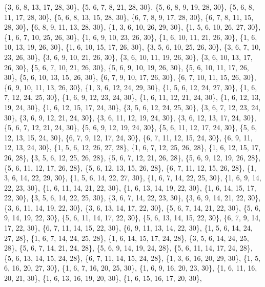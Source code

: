 \documentclass[11pt,a4paper]{article}
\begin{document}
{\{3, 6, 8, 13, 17, 28, 30\}, \{5, 6, 7, 8, 21, 28, 30\}, \{5, 6, 8, 9, 19, 28, 30\}, \{5, 6, 8, 11, 17, 28, 30\}, \{5, 6, 8, 13, 15, 28, 30\},
\{6, 7, 8, 9, 17, 28, 30\}, \{6, 7, 8, 11, 15, 28, 30\}, \{6, 8, 9, 11, 13, 28, 30\}, \{1, 3, 6, 10, 26, 29, 30\}, \{1, 5, 6, 10, 26, 27, 30\},
\{1, 6, 7, 10, 25, 26, 30\}, \{1, 6, 9, 10, 23, 26, 30\}, \{1, 6, 10, 11, 21, 26, 30\}, \{1, 6, 10, 13, 19, 26, 30\}, \{1, 6, 10, 15, 17, 26, 30\},
\{3, 5, 6, 10, 25, 26, 30\}, \{3, 6, 7, 10, 23, 26, 30\}, \{3, 6, 9, 10, 21, 26, 30\}, \{3, 6, 10, 11, 19, 26, 30\}, \{3, 6, 10, 13, 17, 26, 30\},
\{5, 6, 7, 10, 21, 26, 30\}, \{5, 6, 9, 10, 19, 26, 30\}, \{5, 6, 10, 11, 17, 26, 30\}, \{5, 6, 10, 13, 15, 26, 30\}, \{6, 7, 9, 10, 17, 26, 30\},
\{6, 7, 10, 11, 15, 26, 30\}, \{6, 9, 10, 11, 13, 26, 30\}, \{1, 3, 6, 12, 24, 29, 30\}, \{1, 5, 6, 12, 24, 27, 30\}, \{1, 6, 7, 12, 24, 25, 30\},
\{1, 6, 9, 12, 23, 24, 30\}, \{1, 6, 11, 12, 21, 24, 30\}, \{1, 6, 12, 13, 19, 24, 30\}, \{1, 6, 12, 15, 17, 24, 30\}, \{3, 5, 6, 12, 24, 25, 30\},
\{3, 6, 7, 12, 23, 24, 30\}, \{3, 6, 9, 12, 21, 24, 30\}, \{3, 6, 11, 12, 19, 24, 30\}, \{3, 6, 12, 13, 17, 24, 30\}, \{5, 6, 7, 12, 21, 24, 30\},
\{5, 6, 9, 12, 19, 24, 30\}, \{5, 6, 11, 12, 17, 24, 30\}, \{5, 6, 12, 13, 15, 24, 30\}, \{6, 7, 9, 12, 17, 24, 30\}, \{6, 7, 11, 12, 15, 24, 30\},
\{6, 9, 11, 12, 13, 24, 30\}, \{1, 5, 6, 12, 26, 27, 28\}, \{1, 6, 7, 12, 25, 26, 28\}, \{1, 6, 12, 15, 17, 26, 28\}, \{3, 5, 6, 12, 25, 26, 28\},
\{5, 6, 7, 12, 21, 26, 28\}, \{5, 6, 9, 12, 19, 26, 28\}, \{5, 6, 11, 12, 17, 26, 28\}, \{5, 6, 12, 13, 15, 26, 28\}, \{6, 7, 11, 12, 15, 26, 28\},
\{1, 3, 6, 14, 22, 29, 30\}, \{1, 5, 6, 14, 22, 27, 30\}, \{1, 6, 7, 14, 22, 25, 30\}, \{1, 6, 9, 14, 22, 23, 30\}, \{1, 6, 11, 14, 21, 22, 30\},
\{1, 6, 13, 14, 19, 22, 30\}, \{1, 6, 14, 15, 17, 22, 30\}, \{3, 5, 6, 14, 22, 25, 30\}, \{3, 6, 7, 14, 22, 23, 30\}, \{3, 6, 9, 14, 21, 22, 30\},
\{3, 6, 11, 14, 19, 22, 30\}, \{3, 6, 13, 14, 17, 22, 30\}, \{5, 6, 7, 14, 21, 22, 30\}, \{5, 6, 9, 14, 19, 22, 30\}, \{5, 6, 11, 14, 17, 22, 30\},
\{5, 6, 13, 14, 15, 22, 30\}, \{6, 7, 9, 14, 17, 22, 30\}, \{6, 7, 11, 14, 15, 22, 30\}, \{6, 9, 11, 13, 14, 22, 30\}, \{1, 5, 6, 14, 24, 27, 28\},
\{1, 6, 7, 14, 24, 25, 28\}, \{1, 6, 14, 15, 17, 24, 28\}, \{3, 5, 6, 14, 24, 25, 28\}, \{5, 6, 7, 14, 21, 24, 28\}, \{5, 6, 9, 14, 19, 24, 28\},
\{5, 6, 11, 14, 17, 24, 28\}, \{5, 6, 13, 14, 15, 24, 28\}, \{6, 7, 11, 14, 15, 24, 28\}, \{1, 3, 6, 16, 20, 29, 30\}, \{1, 5, 6, 16, 20, 27, 30\},
\{1, 6, 7, 16, 20, 25, 30\}, \{1, 6, 9, 16, 20, 23, 30\}, \{1, 6, 11, 16, 20, 21, 30\}, \{1, 6, 13, 16, 19, 20, 30\}, \{1, 6, 15, 16, 17, 20, 30\},
}
\end{document}
